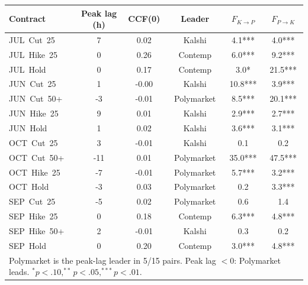 \begin{tabular}{lccccc}
\toprule
Contract & Peak lag (h) & CCF(0) & Leader & $F_{K\to P}$ & $F_{P\to K}$ \\
\midrule
JUL~Cut~25 & 7 & 0.02 & Kalshi & 4.1*** & 4.0*** \\
JUL~Hike~25 & 0 & 0.26 & Contemp & 6.0*** & 9.2*** \\
JUL~Hold & 0 & 0.17 & Contemp & 3.0* & 21.5*** \\
JUN~Cut~25 & 1 & -0.00 & Kalshi & 10.8*** & 3.9*** \\
JUN~Cut~50+ & -3 & -0.01 & Polymarket & 8.5*** & 20.1*** \\
JUN~Hike~25 & 9 & 0.01 & Kalshi & 2.9*** & 2.7*** \\
JUN~Hold & 1 & 0.02 & Kalshi & 3.6*** & 3.1*** \\
OCT~Cut~25 & 3 & -0.01 & Kalshi & 0.1 & 0.2 \\
OCT~Cut~50+ & -11 & 0.01 & Polymarket & 35.0*** & 47.5*** \\
OCT~Hike~25 & -7 & -0.01 & Polymarket & 5.7*** & 3.2*** \\
OCT~Hold & -3 & 0.03 & Polymarket & 0.2 & 3.3*** \\
SEP~Cut~25 & -5 & 0.02 & Polymarket & 0.6 & 1.4 \\
SEP~Hike~25 & 0 & 0.18 & Contemp & 6.3*** & 4.8*** \\
SEP~Hike~50+ & 2 & -0.01 & Kalshi & 0.3 & 0.2 \\
SEP~Hold & 0 & 0.20 & Contemp & 3.0*** & 4.8*** \\
\midrule
\multicolumn{6}{l}{\footnotesize Polymarket is the peak-lag leader in 5/15 pairs. Peak lag $<0$: Polymarket leads. $^{*}p<.10,^{**}p<.05,^{***}p<.01$.} \\
\bottomrule
\end{tabular}